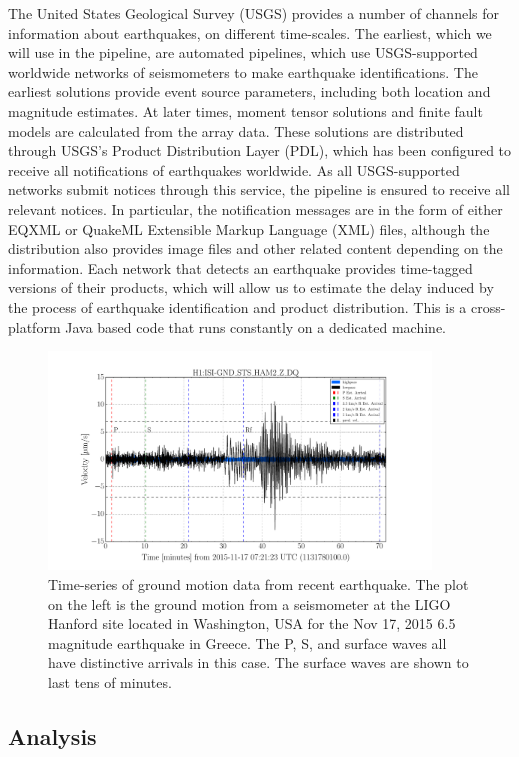 \documentclass[reprint, prl, aps, showpacs]{revtex4-1}
\begin{document}
The United States Geological Survey (USGS) provides a number of channels for information about earthquakes, on different time-scales. The earliest, which we will use in the pipeline, are automated pipelines, which use USGS-supported worldwide networks of seismometers to make earthquake identifications. The earliest solutions provide event source parameters, including both location and magnitude estimates. At later times, moment tensor solutions and finite fault models are calculated from the array data. These solutions are distributed through USGS's Product Distribution Layer (PDL), which has been configured to receive all notifications of earthquakes worldwide. As all USGS-supported networks submit notices through this service, the pipeline is ensured to receive all relevant notices.
In particular, the notification messages are in the form of either EQXML or QuakeML Extensible Markup Language (XML) files, although the distribution also provides image files and other related content depending on the information. Each network that detects an earthquake provides time-tagged versions of their products, which will allow us to estimate the delay induced by the process of earthquake identification and product distribution. This is a cross-platform Java based code that runs constantly on a dedicated machine. 

\begin{figure}[t]
\hspace*{-0.5cm}
\centering
\includegraphics[width=4in]{timeseries.pdf}
\caption{Time-series of ground motion data from recent earthquake. The plot on the left is the ground motion from a seismometer at the LIGO Hanford site located in Washington, USA for the Nov 17, 2015 6.5 magnitude earthquake in Greece. The P, S, and surface waves all have distinctive arrivals in this case. The surface waves are shown to last tens of minutes.}
 \label{fig:timeseries}
 \end{figure}

\subsection{Analysis}
\end{document}
